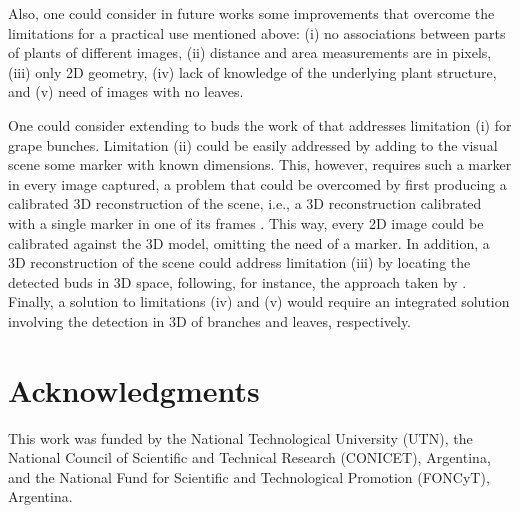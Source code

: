 \documentclass[a4paper,authoryear,review]{elsarticle}
\begin{document}
	
	Also, one could consider in future works some improvements that overcome the limitations for a practical use mentioned above: (i) no associations between parts of plants of different images, (ii) distance and area measurements are in pixels, (iii) only 2D geometry, (iv) lack of knowledge of the underlying plant structure, and (v) need of images with no leaves.
	
	One could consider extending to buds the work of \cite{santos2020grape} that addresses limitation (i) for grape bunches. 
	Limitation (ii) could be easily addressed by adding to the visual scene some marker with known dimensions. This, however, requires such a marker in every image captured, a problem that could be overcomed by first producing a calibrated 3D reconstruction of the scene, i.e., a 3D reconstruction calibrated with a single marker in one of its frames \cite{hartley2003multiple, moons20093d}. This way, every 2D image could be calibrated against the 3D model, omitting the need of a marker. 
	In addition, a 3D reconstruction of the scene could address limitation (iii) by locating the detected buds in 3D space, following, for instance, the approach taken by \cite{diaz2018grapevine}.
	Finally, a solution to limitations (iv) and (v) would require an integrated solution involving the detection in 3D of branches and leaves, respectively. 
	
	
	
	\section*{Acknowledgments}
	
	This work was funded by the National Technological University (UTN), the National Council of Scientific and Technical Research (CONICET), Argentina, and the National Fund for Scientific and Technological Promotion (FONCyT), Argentina.
	
	
	
\end{document}
